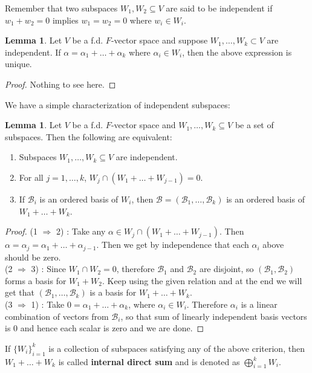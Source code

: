 \documentclass[letterpaper,11pt,twoside]{article}
\theoremstyle{definition}
\theoremstyle{definition}
\theoremstyle{definition}
\theoremstyle{definition}
\newtheorem{lemma}[proposition]{\textbf{Lemma}}
\theoremstyle{definition}
\theoremstyle{definition}
\theoremstyle{remark}
\theoremstyle{definition}
\begin{document}
    Remember that two subspaces $W_1,W_2 \subseteq V$ are said to be independent if $w_1 + w_2 = 0$ implies $w_1=w_2 = 0$ where $w_i\in W_i$.
    \begin{lemma}\label{L-2.6.1}
    Let $V$ be a f.d. $F$-vector space and suppose $W_1,\dots,W_k \subset V$ are independent. If $\alpha = \alpha_1 + \dots + \alpha_k$ where $\alpha_i \in W_i$, then the above expression is unique.
    \end{lemma}
    \begin{proof}
    Nothing to see here.
    \end{proof}
    We have a simple characterization of independent subspaces:
    \begin{lemma}
    Let $V$ be a f.d. $F$-vector space and $W_1,\dots, W_k \subseteq V$ be a set of subspaces. Then the following are equivalent:
    \begin{enumerate}
        \item {Subspaces $W_1,\dots,W_k \subseteq V$ are independent.}
        \item{For all $j=1,\dots,k$, $W_j \cap (W_1 + \dots + W_{j-1}) = 0$.}
        \item{If $\mathcal{B}_i$ is an ordered basis of $W_i$, then $\mathcal{B} = (\mathcal{B}_1,\dots,\mathcal{B}_k)$ is an ordered basis of $W_1+\dots + W_k$.}
    \end{enumerate}
    \end{lemma}
    \begin{proof}
    (1 $\Rightarrow $ 2) : Take any $\alpha \in W_j\cap (W_1 + \dots + W_{j-1})$. Then $\alpha = \alpha_j = \alpha_1 + \dots + \alpha_{j-1}$. Then we get by independence that each $\alpha_i$ above should be zero.\\
    (2 $\Rightarrow$ 3) : Since $W_1\cap W_2 = 0$, therefore $\mathcal{B}_1$ and $\mathcal{B}_2$ are disjoint, so $(\mathcal{B}_1,\mathcal{B}_2)$ forms a basis for $W_1+W_2$. Keep using the given relation and at the end we will get that $(\mathcal{B}_1,\dots,\mathcal{B}_k)$ is a basis for $W_1+\dots + W_k$.\\
    (3 $\Rightarrow $ 1) : Take $0 = \alpha_1 + \dots + \alpha_k$, where $\alpha_i \in W_i$. Therefore $\alpha_i$ is a linear combination of vectors from $\mathcal{B}_i$, so that sum of linearly independent basis vectors is 0 and hence each scalar is zero and we are done. 
    \end{proof}
    If $\{W_i\}_{i=1}^k$ is a collection of subspaces satisfying any of the above criterion, then $W_1 + \dots +W_k$ is called \textbf{internal direct sum} and is denoted as $\bigoplus_{i=1}^k W_i$.
\end{document}
